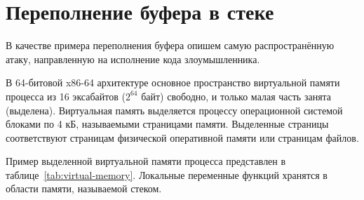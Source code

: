 \section{Переполнение буфера в стеке}

В качестве примера переполнения буфера опишем самую распространённую атаку, направленную на исполнение кода злоумышленника.

В 64-битовой x86-64 архитектуре основное пространство виртуальной памяти процесса из 16 эксабайтов ($2^{64}$ байт) свободно, и только малая часть занята (выделена). Виртуальная память выделяется процессу операционной системой блоками по 4 кБ, называемыми страницами памяти. Выделенные страницы соответствуют страницам физической оперативной памяти или страницам файлов.

Пример выделенной виртуальной памяти процесса представлен в таблице~\ref{tab:virtual-memory}. Локальные переменные функций хранятся в области памяти, называемой стеком.
\begin{table}[!ht]
    \centering
    \caption{Пример структуры виртуальной памяти процесса\label{tab:virtual-memory}}
\end{table}


